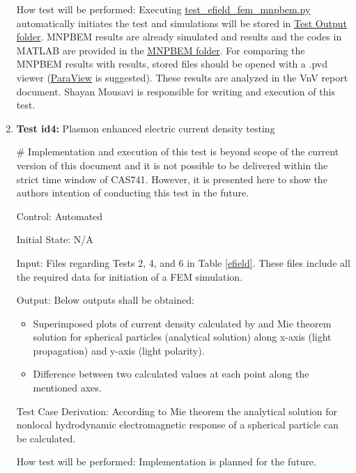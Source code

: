 \documentclass[12pt, titlepage]{article}
\begin{document}
\begin{enumerate}
	How test will be performed: Executing  \href{https://github.com/shmouses/SPDFM/tree/master/src/test_efield_fem_mnpbem.py}{test\_efield\_fem\_mnpbem.py} automatically initiates the test and simulations will be stored in  \href{https://github.com/shmouses/SPDFM/tree/master/src/Test Output}{Test Output folder}. MNPBEM results are already simulated and results and the codes in MATLAB are provided in the \href{https://github.com/shmouses/SPDFM/tree/master/src/MNPBEM}{MNPBEM folder}. For comparing the  MNPBEM results with \progname{} results, stored files should be opened with a .pvd viewer (\href{www.paraview.org}{ParaView} is suggested). These results are analyzed in the VnV report document. Shayan Mousavi is responsible for writing and execution of this test.   \\
		
		
	\newpage	
	
	\item{\textbf{Test id4:} Plasmon enhanced electric current density testing\\}	
	
	\# Implementation and execution of this test is beyond scope of the current version of this document and it is not possible to be delivered within the strict time window of CAS741. However, it is presented here to show the authors intention of conducting this test in the future. 
	
	
	Control: Automated
	
	Initial State: N/A 
	
	Input: Files regarding Tests 2, 4, and 6 in Table \ref{efield}. These files include all the required data for initiation of a FEM simulation. 
	
	Output: Below outputs shall be obtained: 
	\begin{itemize}
		\item Superimposed plots of current density calculated by \progname{} and Mie theorem solution for spherical particles (analytical solution) along x-axis (light propagation) and y-axis (light polarity).
		
		\item  Difference between two calculated values at each point along the mentioned axes.
		
	\end{itemize}
	
	
	Test Case Derivation: According to Mie theorem the analytical solution for nonlocal hydrodynamic electromagnetic response of a spherical particle can be calculated. 
	
	How test will be performed: Implementation is planned for the future.
	
\end{enumerate}
	
\end{document}
